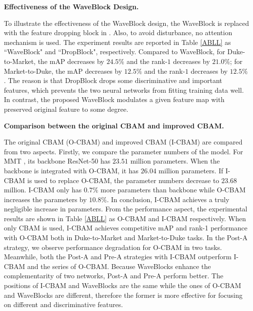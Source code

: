 \documentclass[journal]{IEEEtran}
\begin{document}
\textbf{Effectiveness of the WaveBlock Design.}\par 
To illustrate the effectiveness of the WaveBlock design, the WaveBlock is replaced with the feature dropping block in \cite{dai2019batch}. Also, to avoid disturbance, no attention mechanism is used. The experiment results are reported in Table \ref{ABLL} as ``WaveBlock" and ``DropBlock", respectively. Compared to WaveBlock, for Duke-to-Market, the mAP decreases by $24.5\%$
and the rank-$1$ decreases by $21.0\%$; for Market-to-Duke, the mAP decreases by $12.5\%$ and the rank-$1$ decreases by $12.5\%$. The reason is that DropBlock drops some discriminative and important features, which prevents the two neural networks from fitting training data well. In contrast, the proposed WaveBlock modulates a given feature map with preserved original feature to some degree.

\textbf{Comparison between the original CBAM and improved CBAM.}\par 
The original CBAM (O-CBAM) and improved CBAM (I-CBAM) are compared from two aspects. Firstly, we compare the parameter numbers of the model. For MMT \cite{ge2020mutual}, its backbone ResNet-50 has $23.51$ million parameters. When the backbone is integrated with O-CBAM, it has $26.04$ million parameters. If I-CBAM is used to replace O-CBAM, the parameter numbers decrease to $23.68$ million. I-CBAM only has $0.7\%$ more parameters than backbone while O-CBAM increases the parameters by $10.8\%$. In conclusion, I-CBAM achieves a truly negligible increase in parameters. From the performance aspect, the experimental results are shown in Table \ref{ABLL} as O-CBAM and I-CBAM respectively. When only CBAM is used, I-CBAM achieves competitive mAP and rank-1 performance with O-CBAM both in Duke-to-Market and Market-to-Duke tasks. In the Post-A strategy, we observe performance degradation for O-CBAM in two tasks. Meanwhile, both the Post-A and Pre-A strategies with I-CBAM outperform I-CBAM and the series of O-CBAM. Because WaveBlocks enhance the complementarity of two networks, Post-A and Pre-A perform better. The positions of I-CBAM and WaveBlocks are the same while the ones of O-CBAM and WaveBlocks are different, therefore the former is more effective for focusing on different and discriminative features.
\end{document}
